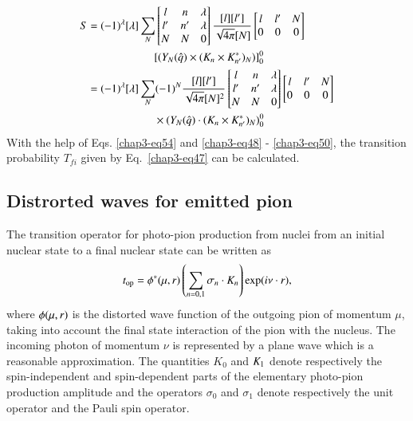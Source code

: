 \begin{align}
  S & = (-1)^\lambda [\lambda] \sum_{N} \begin{bmatrix} l & n & \lambda\\ l' & n' & \lambda\\ N & N & 0  \end{bmatrix}
  \frac{[l][l']}{\sqrt{4 \pi}[N]} \begin{bmatrix}l & l' & N\\ 0 & 0 & 0  \end{bmatrix}\notag \\
       & \qquad \qquad \qquad [(Y_N ({\boldmath \hat{q}}) \times ({\boldmath K}_n \times {\boldmath K_{n'}^\ast})_N)]_0^0\notag \\
  & = (-1)^\lambda [\lambda] \sum_{N} (-1)^N  \frac{[l][l']}{\sqrt{4 \pi}[N]^2}
  \begin{bmatrix} l & n & \lambda\\ l' & n' & \lambda\\ N & N & 0  \end{bmatrix}
  \begin{bmatrix}l & l' & N\\ 0 & 0 & 0  \end{bmatrix} \notag \\
  & \qquad \qquad \qquad \times (Y_N ({\boldmath \hat{q}}) \cdot  ({\boldmath K}_n \times {\boldmath K_{n'}^\ast})_N)_0^0\label{chap3-eq54}
\end{align}
With the help of Eqs. \eqref{chap3-eq54} and \eqref{chap3-eq48} - \eqref{chap3-eq50}, the transition probability $T_{fi}$ given by Eq.\ \eqref{chap3-eq47} can be calculated.

\subsection{Distrorted waves for emitted pion} \label{chap3-sec5.2}

The transition operator for photo-pion production from nuclei from an initial nuclear state to a final nuclear state can be written as
\begin{equation}
t_{\text{op}} = \phi^\ast ({\boldmath \mu, r}) \left( \sum_{n=0, 1} \sigma_n \cdot {\boldmath K}_n\right) \exp (i \nu \cdot {\boldmath r}), \label{chap3-eq55}
\end{equation}
where $\phi (\mu, {\boldmath r})$ is the distorted wave function of the outgoing pion of momentum $\mu$, taking into account the final state interaction of the pion with the nucleus. The incoming photon of momentum $\nu$ is represented by a plane wave which is a reasonable approximation. The quantities $K_0$ and ${\boldmath K}_1$ denote respectively the spin-independent and spin-dependent parts of the elementary photo-pion production amplitude and the operators $\sigma_0$ and $\sigma_1$ denote respectively the unit operator and the Pauli spin operator.

